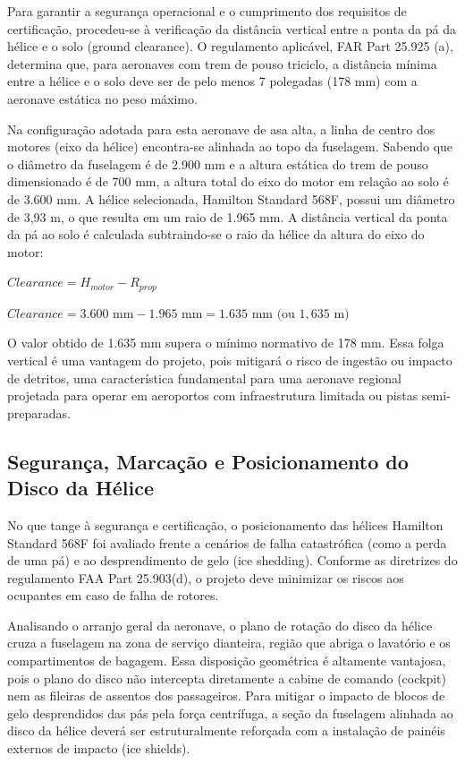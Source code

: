 Para garantir a segurança operacional e o cumprimento dos requisitos de certificação, procedeu-se à verificação da distância vertical entre a ponta da pá da hélice e o solo (ground clearance). O regulamento aplicável, FAR Part 25.925 (a), determina que, para aeronaves com trem de pouso triciclo, a distância mínima entre a hélice e o solo deve ser de pelo menos 7 polegadas (178 mm) com a aeronave estática no peso máximo.  

Na configuração adotada para esta aeronave de asa alta, a linha de centro dos motores (eixo da hélice) encontra-se alinhada ao topo da fuselagem. Sabendo que o diâmetro da fuselagem é de 2.900 mm e a altura estática do trem de pouso dimensionado é de 700 mm, a altura total do eixo do motor em relação ao solo é de 3.600 mm.  A hélice selecionada, Hamilton Standard 568F, possui um diâmetro de 3,93 m, o que resulta em um raio de 1.965 mm. A distância vertical da ponta da pá ao solo é calculada subtraindo-se o raio da hélice da altura do eixo do motor: 

$Clearance = H_{motor} - R_{prop}$

$Clearance = 3.600 \text{ mm} - 1.965 \text{ mm} = 1.635 \text{ mm} \text{ (ou } 1,635 \text{ m)}$

O valor obtido de 1.635 mm supera o mínimo normativo de 178 mm. Essa folga vertical é uma vantagem do projeto, pois mitigará o risco de ingestão ou impacto de detritos, uma característica fundamental para uma aeronave regional projetada para operar em aeroportos com infraestrutura limitada ou pistas semi-preparadas.

\subsection{Segurança, Marcação e Posicionamento do Disco da Hélice}
\label{sec:seguranca_helice}

No que tange à segurança e certificação, o posicionamento das hélices Hamilton Standard 568F foi avaliado frente a cenários de falha catastrófica (como a perda de uma pá) e ao desprendimento de gelo (ice shedding). Conforme as diretrizes do regulamento FAA Part 25.903(d), o projeto deve minimizar os riscos aos ocupantes em caso de falha de rotores.

Analisando o arranjo geral da aeronave, o plano de rotação do disco da hélice cruza a fuselagem na zona de serviço dianteira, região que abriga o lavatório e os compartimentos de bagagem. Essa disposição geométrica é altamente vantajosa, pois o plano do disco não intercepta diretamente a cabine de comando (cockpit) nem as fileiras de assentos dos passageiros. Para mitigar o impacto de blocos de gelo desprendidos das pás pela força centrífuga, a seção da fuselagem alinhada ao disco da hélice deverá ser estruturalmente reforçada com a instalação de painéis externos de impacto (ice shields).

